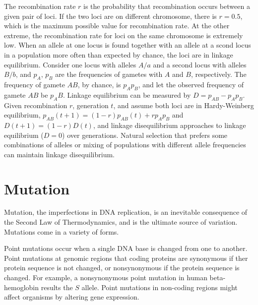 \documentclass[11pt]{article}
\begin{document}
\begin{sloppypar}
\par

The recombination rate $r$ is the probability that recombination occurs between a given pair of loci. 
If the two loci are on different chromosome, there is $r=0.5$, which is the maximum possible value for recombination rate. 
At the other extreme, the recombination rate for loci on the same chromosome is extremely low. 
When an allele at one locus is found together with an allele at a scond locus in a population more often than expected by chance, the loci are in linkage equilibrium. 
Consider one locus with alleles $A/a$ and a second locus with alleles $B/b$, and $p_A$, $p_B$ are the frequencies of gametes with $A$ and $B$, respectively. 
The frequency of gamete $AB$, by chance, is $p_Ap_B$, and let the observed frequency of gamete $AB$ be $p_AB$. 
Linkage equilibrium can be measured by $D=p_{AB}-p_Ap_B$. 
Given recombination $r$, generation $t$, and assume both loci are in Hardy-Weinberg equilibrium, $p_{AB}(t+1)=(1-r)p_{AB}(t)+rp_Ap_B$ and $D(t+1)=(1-r)D(t)$, and linkage disequilibrium approaches to linkage equilibrium ($D=0$) over generations.
Natural selection that prefers some combinations of alleles or mixing of populations with different allele frequencies can maintain linkage disequilibrium. 

\section{Mutation}
Mutation, the imperfections in DNA replication, is an inevitable consequence of the Second Law of Thermodynamics, and is the ultimate source of variation. 
Mutations come in a variety of forms. 

\par

Point mutations occur when a single DNA base is changed from one to another. 
Point mutations at genomic regions that coding proteins are synonymous if ther protein sequence is not changed, or nonsynonymous if the protein sequence is changed. 
For example, a nonsynonymous point mutation in human beta-hemoglobin results the $S$ allele. 
Point mutations in non-coding regions might affect organisms by altering gene expression. 

\par


\end{sloppypar}
\end{document}
